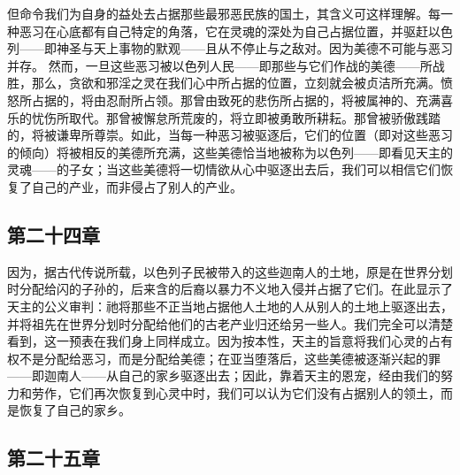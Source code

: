 \par

但命令我们为自身的益处去占据那些最邪恶民族的国土，其含义可这样理解。每一种恶习在心底都有自己特定的角落，它在灵魂的深处为自己占据位置，并驱赶以色列——即神圣与天上事物的默观——且从不停止与之敌对。因为美德不可能与恶习并存。  然而，一旦这些恶习被以色列人民——即那些与它们作战的美德——所战胜，那么，贪欲和邪淫之灵在我们心中所占据的位置，立刻就会被贞洁所充满。愤怒所占据的，将由忍耐所占领。那曾由致死的悲伤所占据的，将被属神的、充满喜乐的忧伤所取代。那曾被懈怠所荒废的，将立即被勇敢所耕耘。那曾被骄傲践踏的，将被谦卑所尊崇。如此，当每一种恶习被驱逐后，它们的位置（即对这些恶习的倾向）将被相反的美德所充满，这些美德恰当地被称为以色列——即看见天主的灵魂——的子女；当这些美德将一切情欲从心中驱逐出去后，我们可以相信它们恢复了自己的产业，而非侵占了别人的产业。\par


\subsection{第二十四章}

\par

因为，据古代传说所载，以色列子民被带入的这些迦南人的土地，原是在世界分划时分配给闪的子孙的，后来含的后裔以暴力不义地入侵并占据了它们。在此显示了天主的公义审判：祂将那些不正当地占据他人土地的人从别人的土地上驱逐出去，并将祖先在世界分划时分配给他们的古老产业归还给另一些人。我们完全可以清楚看到，这一预表在我们身上同样成立。因为按本性，天主的旨意将我们心灵的占有权不是分配给恶习，而是分配给美德；在亚当堕落后，这些美德被逐渐兴起的罪——即迦南人——从自己的家乡驱逐出去；因此，靠着天主的恩宠，经由我们的努力和劳作，它们再次恢复到心灵中时，我们可以认为它们没有占据别人的领土，而是恢复了自己的家乡。\par


\subsection{第二十五章}

\par

